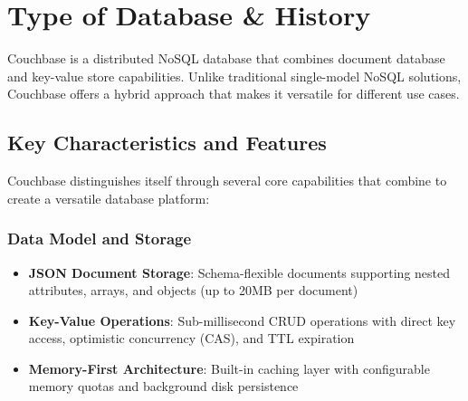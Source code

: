 \chapter{Type of Database \& History}

Couchbase is a distributed NoSQL database that combines document database and key-value store capabilities. Unlike traditional single-model NoSQL solutions, Couchbase offers a hybrid approach that makes it versatile for different use cases.





\section{Key Characteristics and Features}

Couchbase distinguishes itself through several core capabilities that combine to create a versatile database platform:

\subsection{Data Model and Storage}
\begin{itemize}
  \item \textbf{JSON Document Storage}: Schema-flexible documents supporting nested attributes, arrays, and objects (up to 20MB per document)
  \item \textbf{Key-Value Operations}: Sub-millisecond CRUD operations with direct key access, optimistic concurrency (CAS), and TTL expiration
  \item \textbf{Memory-First Architecture}: Built-in caching layer with configurable memory quotas and background disk persistence
\end{itemize}

